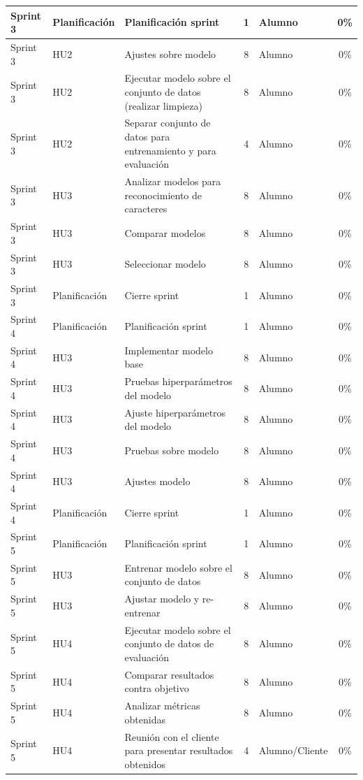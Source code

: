 \documentclass[
11pt, %
]{charter}
\begin{document}
\begin{table}[htpb]
\begin{tabularx}{\linewidth}{@{}|l|l|X|c|l|c|@{}}
Sprint 3	&	Planificación	&	Planificación sprint	&	1	&	Alumno	&	0\%	\\ \hline
Sprint 3	&	HU2	&	Ajustes sobre modelo	&	8	&	Alumno	&	0\%	\\ \hline
Sprint 3	&	HU2	&	Ejecutar modelo sobre el conjunto de datos (realizar limpieza)	&	8	&	Alumno	&	0\%	\\ \hline
Sprint 3	&	HU2	&	Separar conjunto de datos para entrenamiento y para evaluación	&	4	&	Alumno	&	0\%	\\ \hline
Sprint 3	&	HU3	&	Analizar modelos para reconocimiento de caracteres	&	8	&	Alumno	&	0\%	\\ \hline
Sprint 3	&	HU3	&	Comparar modelos	&	8	&	Alumno	&	0\%	\\ \hline
Sprint 3	&	HU3	&	Seleccionar modelo	&	8	&	Alumno	&	0\%	\\ \hline
Sprint 3	&	Planificación	&	Cierre sprint	&	1	&	Alumno	&	0\%	\\ \hline
Sprint 4	&	Planificación	&	Planificación sprint	&	1	&	Alumno	&	0\%	\\ \hline
Sprint 4	&	HU3	&	Implementar modelo base 	&	8	&	Alumno	&	0\%	\\ \hline
Sprint 4	&	HU3	&	Pruebas hiperparámetros del modelo	&	8	&	Alumno	&	0\%	\\ \hline
Sprint 4	&	HU3	&	Ajuste hiperparámetros del modelo	&	8	&	Alumno	&	0\%	\\ \hline
Sprint 4	&	HU3	&	Pruebas sobre modelo	&	8	&	Alumno	&	0\%	\\ \hline
Sprint 4	&	HU3	&	Ajustes modelo	&	8	&	Alumno	&	0\%	\\ \hline
Sprint 4	&	Planificación	&	Cierre sprint	&	1	&	Alumno	&	0\%	\\ \hline
Sprint 5	&	Planificación	&	Planificación sprint	&	1	&	Alumno	&	0\%	\\ \hline
Sprint 5	&	HU3	&	Entrenar modelo sobre el conjunto de datos	&	8	&	Alumno	&	0\%	\\ \hline
Sprint 5	&	HU3	&	Ajustar modelo y re-entrenar	&	8	&	Alumno	&	0\%	\\ \hline
Sprint 5	&	HU4	&	Ejecutar modelo sobre el conjunto de datos de evaluación	&	8	&	Alumno	&	0\%	\\ \hline
Sprint 5	&	HU4	&	Comparar resultados contra objetivo	&	8	&	Alumno	&	0\%	\\ \hline
Sprint 5	&	HU4	&	Analizar métricas obtenidas	&	8	&	Alumno	&	0\%	\\ \hline
Sprint 5	&	HU4	&	Reunión con el cliente para presentar resultados obtenidos	&	4	&	Alumno/Cliente	&	0\%	\\ \hline

\end{tabularx}
\end{table}
\end{document}
